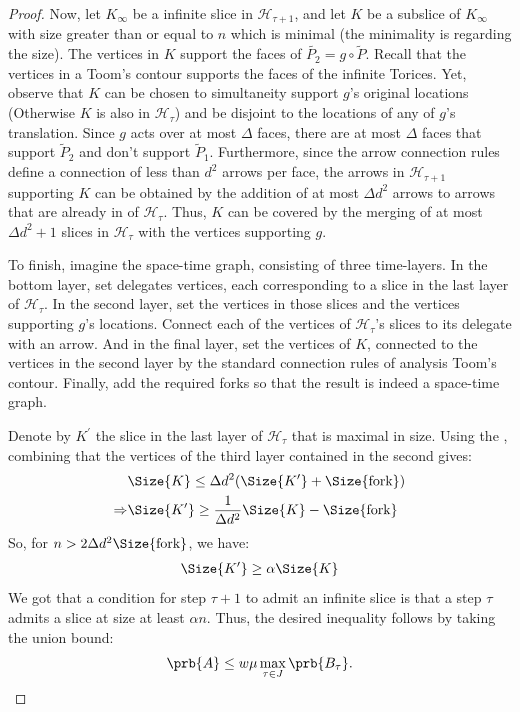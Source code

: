 \begin{proof}
Now, let $K_{\infty}$ be a infinite slice in $\mathcal{H}_{\tau+1}$, and let $K$ be a subslice of $K_{\infty}$ with size greater than or equal to $n$ which is minimal (the minimality is regarding the size). The vertices in $K$ support the faces of $\tilde{P_{2}} = g \circ \tilde{P}$. Recall that the vertices in a Toom's contour supports the faces of the infinite Torices. Yet, observe that $K$ can be chosen to simultaneity support $g$'s original locations (Otherwise $K$ is also in $\mathcal{H}_{\tau}$) and be disjoint to the locations of any of $g$'s translation. Since $g$ acts over at most $\Delta$ faces, there are at most $\Delta$ faces that support $\tilde{P}_{2}$ and don't support $\tilde{P}_{1}$. Furthermore, since the arrow connection rules define a connection of less than $d^{2}$ arrows per face, the arrows in $\mathcal{H}_{\tau+1}$ supporting $K$ can be obtained by the addition of at most $\Delta d^{2}$ arrows to arrows that are already in of $\mathcal{H}_{\tau}$. Thus, $K$ can be covered by the merging of at most $\Delta d^{2}+1$ slices in $\mathcal{H}_{\tau}$ with the vertices supporting $g$.


To finish, imagine the space-time graph, consisting of three time-layers. In the bottom layer, set delegates vertices, each corresponding to a slice in the last layer of $\mathcal{H}_{\tau}$. In the second layer, set the vertices in those slices and the vertices supporting $g$'s locations. Connect each of the vertices of $\mathcal{H}_{\tau}$'s slices to its delegate with an arrow.
And in the final layer, set the vertices of $K$, connected to the vertices in the second layer by the standard connection rules of analysis Toom's contour. Finally, add the required forks so that the result is indeed a space-time graph.

Denote by $K^{\prime}$ the slice in the last layer of $\mathcal{H}_{\tau}$ that is maximal in size. Using the , combining that the vertices of the third layer contained in the second gives:  
\begin{equation*}
  \begin{split}
     & \Size{K}  \le \Delta d^{2} ( \Size{K^{\prime}} +  \Size{\text{fork}} ) \\
     \Rightarrow & \Size{K^{\prime}} \ge \frac{1}{\Delta d^{2}} \Size{K} - \Size{ \text{fork} }
   \end{split}
\end{equation*}
So, for $n > 2\Delta d^{2} \Size{\text{fork} }$, we have:
\begin{equation*}
  \begin{split}
     \Size{K^{\prime}}  \ge \alpha \Size{K} 
  \end{split}
\end{equation*}
We got that a condition for step $\tau+1$ to admit an infinite slice is that a step $\tau$ admits a slice at size at least $\alpha n$. Thus, the desired inequality follows by taking the union bound:
  \begin{equation*}
    \begin{split}
      \prb{A} \le w\mu\max_{\tau\in J}\prb{B_{\tau}}.
    \end{split}
  \end{equation*}
\end{proof}





